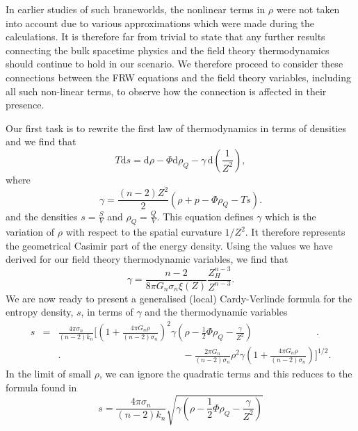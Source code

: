 \documentclass[a4paper,12pt]{article}
\begin{document}
In earlier studies of such braneworlds, the nonlinear terms in $\rho$
were not taken into account due to various approximations which were
made during the calculations.  It is therefore far from trivial to
state that any further results connecting the bulk spacetime physics
and the field theory thermodynamics should continue to hold in our
scenario.  We therefore proceed to consider these connections between
the FRW equations and the field theory variables, including all such
non-linear terms, to observe how the connection is affected in their
presence.

Our first task is to rewrite the first law of thermodynamics in terms
of densities and we find that
\begin{equation}
T\mathrm{d}s = \mathrm{d}\rho - \Phi\mathrm{d}\rho_Q - \gamma \,
\mathrm{d}\left(\frac{1}{Z^2}\right),
\end{equation}
where
\begin{equation} \label{eqn:cardy}
\gamma = \frac{(n-2)Z^2}{2}(\rho + p - \Phi\rho_Q - Ts).
\end{equation}
and the densities $s=\frac{S}{V}$ and $\rho_Q=\frac{Q}{V}$. This
equation defines $\gamma$ which is the variation of $\rho$ with
respect to the spatial curvature $1/Z^2$. It therefore represents the
geometrical Casimir part of the energy density.  Using the values we
have derived for our field theory thermodynamic variables, we find that
\begin{equation}
\gamma = \frac{n-2}{8\pi G_n\sigma_n\xi(Z)}\frac{Z_H^{n-3}}{Z^{n-3}}.
\end{equation}
We are now ready to present a generalised (local) Cardy-Verlinde
formula for the entropy density, $s$, in terms of $\gamma$ and the
thermodynamic variables
\begin{eqnarray} \label{eqn:scardy}
s & = & \frac{4\pi\sigma_n}{(n-2)k_n}   \Bigg[  \left(1+\frac{4\pi
   G_n\rho}{(n-2)\sigma_n}\right)^2
   \gamma\left(\rho-\frac{1}{2}\Phi\rho_Q-\frac{\gamma}{Z^2}\right)
   \phantom{1111111111111}\Bigg. \\ &&
   \Bigg. \phantom{1111111111111111111111111}  -\frac{2\pi
   G_n}{(n-2)\sigma_n}\rho^2 \gamma \left(1+\frac{4\pi G_n
   \rho}{(n-2)\sigma_n}\right) \Bigg]^{1/2}. \nonumber
\end{eqnarray}
In the limit of small $\rho$, we can ignore the quadratic terms and
this reduces to the formula found in
\cite{Savonije:braneCFT,Cai:chargedcardy,Biswas:stiffmatter,Medved:holography}
\begin{equation} \label{eqn:cardy:linear}
s =\frac{4\pi\sigma_n}{(n-2)k_n}
\sqrt{\gamma\left(\rho-\frac{1}{2}\Phi\rho_Q-\frac{\gamma}{Z^2}\right)}
\end{equation}
\end{document}

